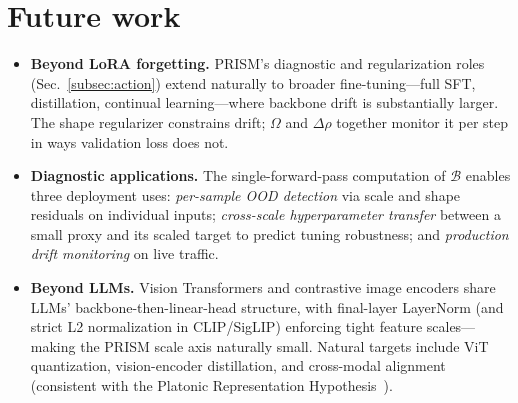 
\section{Future work}
\label{app:future_work}

\begin{itemize}[leftmargin=*]
    \item \textbf{Beyond LoRA forgetting.} PRISM's diagnostic and regularization roles (Sec.~\ref{subsec:action}) extend naturally to broader fine-tuning---full SFT, distillation, continual learning---where backbone drift is substantially larger. The shape regularizer constrains drift; $\Omega$ and $\Delta\rho$ together monitor it per step in ways validation loss does not.
    \item \textbf{Diagnostic applications.} The single-forward-pass computation of $\mathcal{B}$ enables three deployment uses: \emph{per-sample OOD detection} via scale and shape residuals on individual inputs; \emph{cross-scale hyperparameter transfer} between a small proxy and its scaled target to predict tuning robustness; and \emph{production drift monitoring} on live traffic.
    \item \textbf{Beyond LLMs.} Vision Transformers and contrastive image encoders share LLMs' backbone-then-linear-head structure, with final-layer LayerNorm (and strict L2 normalization in CLIP/SigLIP) enforcing tight feature scales---making the PRISM scale axis naturally small. Natural targets include ViT quantization, vision-encoder distillation, and cross-modal alignment (consistent with the Platonic Representation Hypothesis~\cite{huh2024platonic}).
\end{itemize}
